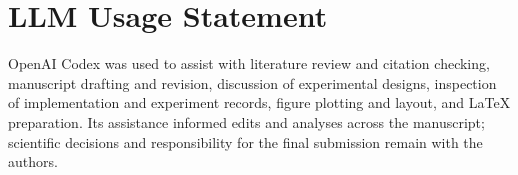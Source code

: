 \section*{LLM Usage Statement}
OpenAI Codex was used to assist with literature review and citation checking, manuscript drafting and revision, discussion of experimental designs, inspection of implementation and experiment records, figure plotting and layout, and LaTeX preparation. Its assistance informed edits and analyses across the manuscript; scientific decisions and responsibility for the final submission remain with the authors.
